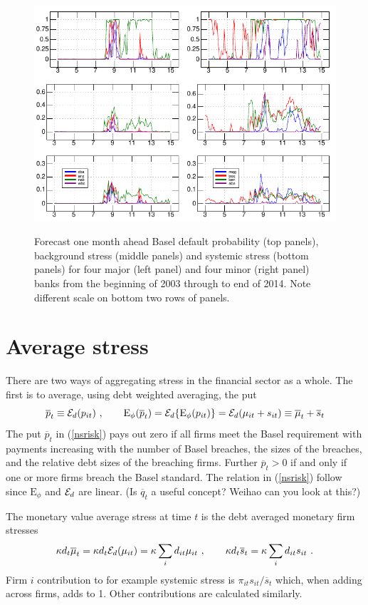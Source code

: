 \documentclass[authoryear]{elsarticle}
\newcommand{\E}{\mathrm{E}}
\newcommand{\Ex}{{\cal E}}
\newcommand{\Exd}{\Ex_d}
\newcommand{\Es}{\E_\phi}
\newcommand{\eref}[1]{(\ref{#1})}
\newcommand{\cq}{\ , \qquad}
\newcommand{\be}[1]{\begin{equation}\label{#1}}
\newcommand{\ee}{\end{equation}}
\begin{document}
 \begin{figure}[htbp]
\begin{center}
\label{default}
\includegraphics{figures/default.pdf}
\caption{Forecast one month ahead  Basel default probability (top panels), background stress (middle panels) and systemic stress (bottom panels) for  four major (left panel) and four minor (right panel)  banks from the beginning of 2003 through to end of 2014.  Note different scale on bottom two rows of panels.}
\end{center}
\end{figure}


\section{Average stress}

There are two ways of aggregating stress in the financial sector as a whole.  The first is to average, using debt weighted averaging, the put
\be{nsrisk}
\overline p_t \equiv \Exd(p_{it}) \cq \Es(\overline p_t)=\Exd\{\Es(p_{it})\} = \Exd(\mu_{it}+s_{it}) \equiv \overline\mu_{t}+\overline s_t
\ee
The put $\overline p_t$ in \eref{nsrisk} pays out zero if all firms meet the Basel requirement with payments increasing with the number of Basel breaches, the sizes of the breaches, and the relative debt sizes of the breaching firms.   Further $\overline p_t>0$  if and only if one or more firms breach the Basel standard.    The relation in \eref{nsrisk} follow since  $\Es$ and $\Exd$ are linear.   (Is $\overline q_t$ a useful concept?   Weihao can you look at this?) 

The monetary value  average  stress at time $t$ is the debt averaged  monetary firm stresses
$$
\kappa d_t\overline\mu_t = \kappa d_t\Exd(\mu_{it}) = \kappa\sum_i d_{it}\mu_{it}\cq \kappa d_t\overline s_t  = \kappa\sum_i d_{it}s_{it}\ . 
$$
Firm  $i$ contribution to for example systemic stress is   
$
\pi_{it}s_{it}/\overline s_t
$
which, when adding across firms, adds to 1.  Other contributions are calculated similarly.
\end{document}
